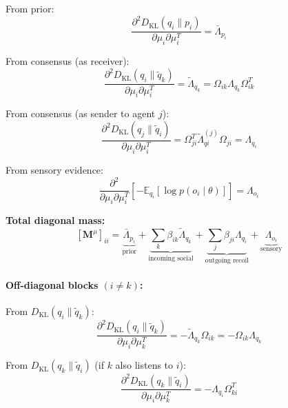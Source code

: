\documentclass[12pt]{article}
\begin{document}
From prior:
\begin{equation}
\frac{\partial^2 D_{\mathrm{KL}}(q_i \| p_i)}{\partial \mu_i \partial \mu_i^T} = \bar{\Lambda}_{p_i}
\end{equation}

From consensus (as receiver):
\begin{equation}
\frac{\partial^2 D_{\mathrm{KL}}(q_i \| \tilde{q}_k)}{\partial \mu_i \partial \mu_i^T} = \tilde{\Lambda}_{q_k} = \Omega_{ik}\Lambda_{q_k}\Omega_{ik}^T
\end{equation}

From consensus (as sender to agent $j$):
\begin{equation}
\frac{\partial^2 D_{\mathrm{KL}}(q_j \| \tilde{q}_i)}{\partial \mu_i \partial \mu_i^T} = \Omega_{ji}^T\tilde{\Lambda}_{qi}^{(j)}\Omega_{ji} = \Lambda_{q_i}
\end{equation}

From sensory evidence:
\begin{equation}
\frac{\partial^2}{\partial \mu_i \partial \mu_i^T}\left[-\mathbb{E}_{q_i}[\log p(o_i \mid \theta)]\right] = \Lambda_{o_i}
\end{equation}

\textbf{Total diagonal mass:}
\begin{equation}
\boxed{
[\mathbf{M}^\mu]_{ii} = \underbrace{\bar{\Lambda}_{p_i}}_{\text{prior}} + \underbrace{\sum_k \beta_{ik}\tilde{\Lambda}_{q_k}}_{\text{incoming social}} + \underbrace{\sum_j \beta_{ji}\Lambda_{q_i}}_{\text{outgoing recoil}} + \underbrace{\Lambda_{o_i}}_{\text{sensory}}
}
\label{eq:mass_diagonal}
\end{equation}

\paragraph{Off-diagonal blocks $(i \neq k)$:}

From $D_{\mathrm{KL}}(q_i \| \tilde{q}_k)$:
\begin{equation}
\frac{\partial^2 D_{\mathrm{KL}}(q_i \| \tilde{q}_k)}{\partial \mu_i \partial \mu_k^T} = -\tilde{\Lambda}_{q_k}\Omega_{ik} = -\Omega_{ik}\Lambda_{q_k}
\end{equation}

From $D_{\mathrm{KL}}(q_k \| \tilde{q}_i)$ (if $k$ also listens to $i$):
\begin{equation}
\frac{\partial^2 D_{\mathrm{KL}}(q_k \| \tilde{q}_i)}{\partial \mu_i \partial \mu_k^T} = -\Lambda_{q_i}\Omega_{ki}^T
\end{equation}
\end{document}
